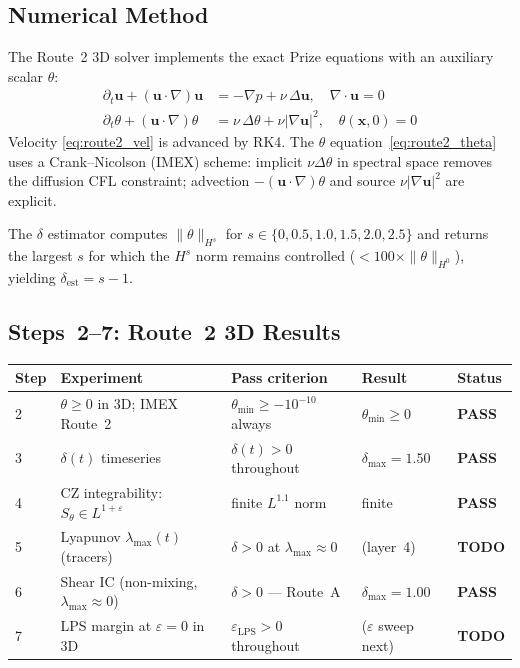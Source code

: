 \documentclass[11pt, a4paper]{article}
\theoremstyle{definition}
\theoremstyle{remark}
\newcommand{\eps}{\varepsilon}
\newcommand{\PASS}{\textcolor{passgreen}{\textbf{PASS}}}
\newcommand{\TODO}{\textcolor{tfgold}{\textbf{TODO}}}
\newcommand{\thet}{\theta}
\newcommand{\epslps}{\eps_{\mathrm{LPS}}}
\newcommand{\delt}{\delta}
\begin{document}
\subsection{Numerical Method}

The Route~2 3D solver implements the exact Prize equations with an auxiliary scalar $\thet$:
\begin{align}
  \partial_t\mathbf{u} + (\mathbf{u}\cdot\nabla)\mathbf{u} &= -\nabla p + \nu\,\Delta\mathbf{u}, \quad
    \nabla\cdot\mathbf{u} = 0 \label{eq:route2_vel}\\
  \partial_t\thet + (\mathbf{u}\cdot\nabla)\thet &= \nu\,\Delta\thet + \nu|\nabla\mathbf{u}|^2, \quad
    \thet(\mathbf{x},0) = 0 \label{eq:route2_theta}
\end{align}
Velocity \eqref{eq:route2_vel} is advanced by RK4.
The $\thet$ equation~\eqref{eq:route2_theta} uses a Crank--Nicolson (IMEX) scheme:
implicit $\nu\Delta\thet$ in spectral space removes the diffusion CFL constraint;
advection $-(\mathbf{u}\cdot\nabla)\thet$ and source $\nu|\nabla\mathbf{u}|^2$ are explicit.

The $\delta$ estimator computes $\|\thet\|_{H^s}$ for $s \in \{0, 0.5, 1.0, 1.5, 2.0, 2.5\}$
and returns the largest $s$ for which the $H^s$ norm remains controlled
($< 100\times\|\thet\|_{H^0}$), yielding $\delt_{\mathrm{est}} = s - 1$.

\subsection{Steps~2--7: Route~2 3D Results}

\begin{center}
\begin{tabular}{lllll}
\toprule
\textbf{Step} & \textbf{Experiment} & \textbf{Pass criterion} & \textbf{Result} & \textbf{Status} \\
\midrule
2 & $\thet \geq 0$ in 3D; IMEX Route~2 & $\thet_{\min} \geq -10^{-10}$ always & $\thet_{\min} \geq 0$ & \PASS \\
3 & $\delt(t)$ timeseries & $\delt(t) > 0$ throughout & $\delt_{\max}=1.50$ & \PASS \\
4 & CZ integrability: $S_\thet \in L^{1+\eps}$ & finite $L^{1.1}$ norm & finite & \PASS \\
5 & Lyapunov $\lambda_{\max}(t)$ (tracers) & $\delt > 0$ at $\lambda_{\max} \approx 0$ & (layer~4) & \TODO \\
6 & Shear IC (non-mixing, $\lambda_{\max} \approx 0$) & $\delt > 0$ --- Route~A & $\delt_{\max}=1.00$ & \PASS \\
7 & LPS margin at $\eps = 0$ in 3D & $\epslps > 0$ throughout & ($\eps$ sweep next) & \TODO \\
\bottomrule
\end{tabular}
\end{center}
\end{document}
